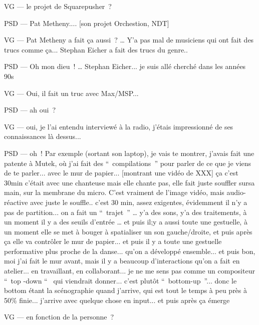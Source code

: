 VG — le projet de Squarepusher ? 

PSD — Pat Metheny.... [son projet Orchestion, NDT] 

VG — Pat Metheny a fait ça aussi ? … Y'a pas mal de musiciens qui ont fait des trucs comme ça... Stephan Eicher a fait des trucs du genre.. 

PSD — Oh mon dieu ! … Stephan Eicher... je suis allé cherché dans les années 90s 

VG — Oui, il fait un truc avec Max/MSP... 

PSD — ah oui ? 

VG — oui, je l'ai entendu interviewé à la radio, j'étais impressionné de ses connaissances là dessus... 

PSD — oh ! Par exemple (sortant son laptop), je vais te montrer, j'avais fait une patente à Mutek, où j'ai fait des “ compilations ” pour parler de ce que je viens de te parler... avec le mur de papier... [montrant une vidéo de XXX] ça c'est 30min c'était avec une chanteuse mais elle chante pas, elle fait juste souffler sursa main, sur  la membrane du micro. C'est vraiment de l'image vidéo, mais audio-réactive avec juste le souffle.. c'est 30 min, assez exigentes, évidemment il n'y a pas de partition... on a fait un “ trajet ” … y'a des sons, y'a des traitements, à un moment il y a des seuils d'entrée … et puis il;y a aussi toute une gestuelle, à un moment elle se met à bouger à spatialiser un son gauche/droite, et puis après ça elle va contrôler le mur de papier... et puis il y a toute une gestuelle performative plus proche de la danse... qu'on a développé ensemble... et puis bon, moi j'ai fait le mur avant, mais il y a beaucoup d'interactions qu'on a fait en atelier... en travaillant, en collaborant... je ne me sens pas comme un compositeur “ top -down “  qui viendrait donner... c'est plutôt “ bottom-up ”... donc le bottom étant la scénographie quand j'arrive, qui est tout le temps à peu près à 50\% finie... j'arrive avec quelque chose en input... et puis après ça émerge 

VG — en fonction de la personne ? 

